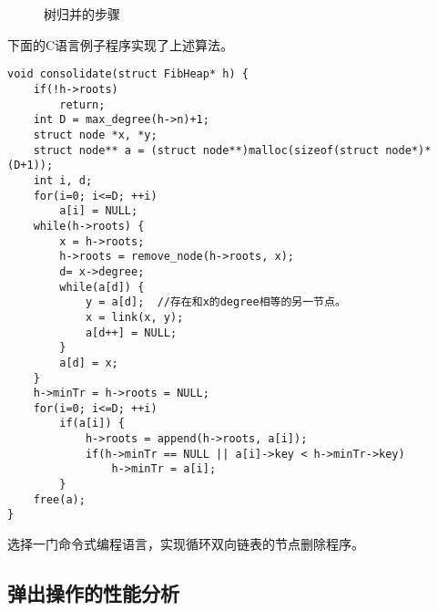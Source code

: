 \documentclass{ctexart}
\begin{document}
\captionsetup[subfigure]{labelformat=empty, margin=10pt}
\begin{figure}[htbp]
  \centering
   \\
   \\
  \caption{树归并的步骤} \label{fig:fib-cons-c}
\end{figure}
\captionsetup[subfigure]{labelformat=parens}

下面的C语言例子程序实现了上述算法。

\lstset{language=C}
\begin{lstlisting}
void consolidate(struct FibHeap* h) {
    if(!h->roots)
        return;
    int D = max_degree(h->n)+1;
    struct node *x, *y;
    struct node** a = (struct node**)malloc(sizeof(struct node*)*(D+1));
    int i, d;
    for(i=0; i<=D; ++i)
        a[i] = NULL;
    while(h->roots) {
        x = h->roots;
        h->roots = remove_node(h->roots, x);
        d= x->degree;
        while(a[d]) {
            y = a[d];  //存在和x的degree相等的另一节点。
            x = link(x, y);
            a[d++] = NULL;
        }
        a[d] = x;
    }
    h->minTr = h->roots = NULL;
    for(i=0; i<=D; ++i)
        if(a[i]) {
            h->roots = append(h->roots, a[i]);
            if(h->minTr == NULL || a[i]->key < h->minTr->key)
                h->minTr = a[i];
        }
    free(a);
}
\end{lstlisting}

\begin{Exercise}
选择一门命令式编程语言，实现循环双向链表的节点删除程序。
\end{Exercise}

\subsection{弹出操作的性能分析}
\end{document}

